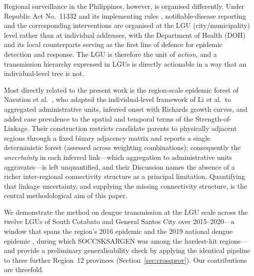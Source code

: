 \documentclass[a4paper,11pt]{article}
\begin{document}
Regional surveillance in the Philippines, however, is organised differently. Under
Republic Act No.~11332 and its implementing rules \cite{RA11332,DOH2020IRR},
notifiable-disease reporting and the corresponding interventions are organised at
the LGU (city/municipality) level rather than at individual addresses, with the
Department of Health (DOH) and its local counterparts serving as the first line of
defence for epidemic detection and response. The LGU is therefore the unit of
\emph{action}, and a transmission hierarchy expressed in LGUs is directly
actionable in a way that an individual-level tree is not.

Most directly related to the present work is the region-scale epidemic forest of
Nasution et al.\ \cite{Nasution2024}, who adapted the individual-level framework
of Li et al.\ to aggregated administrative units, inferred onset with Richards
growth curves, and added case prevalence to the spatial and temporal terms of the
Strength-of-Linkage. Their construction restricts candidate parents to physically
adjacent regions through a fixed binary adjacency matrix and reports a single
deterministic forest (assessed across weighting combinations); consequently the
\emph{uncertainty} in each inferred link---which aggregation to administrative
units aggravates---is left unquantified, and their Discussion names the absence of
a richer inter-regional connectivity structure as a principal limitation.
Quantifying that linkage uncertainty, and supplying the missing connectivity
structure, is the central methodological aim of this paper.

We demonstrate the method on dengue transmission at the LGU scale across the twelve
LGUs of South Cotabato and General Santos City over 2015--2020---a window that
spans the region's 2016 epidemic and the 2019 national dengue epidemic
\cite{DOH2019epi}, during which SOCCSKSARGEN was among the hardest-hit regions---and
provide a preliminary generalisability check by applying the identical pipeline to
three further Region~12 provinces (Section~\ref{sec:crossprov}). Our contributions
are threefold.
\end{document}
